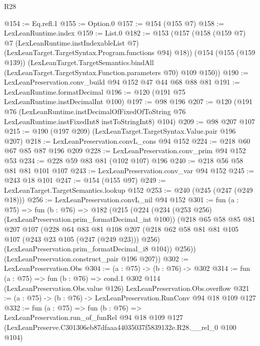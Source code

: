 \begin{lexlean}{R28}
\begin{coremodule}
@154 := Eq.refl.{1}
@155 := Option.{0}
@157 := @154 (@155 @7)
@158 := LexLeanRuntime.index
@159 := List.{0}
@182 := @153
    (@157
      (@158
        (@159 @7)
        @7
        (LexLeanRuntime.instIndexableList @7)
        (LexLeanTarget.TargetSyntax.Program.functions @94)
        @18))
    (@154
      (@155 (@159 @139))
      (LexLeanTarget.TargetSemantics.bindAll
        (LexLeanTarget.TargetSyntax.Function.parameters @70)
        @109
        @150))
@190 := LexLeanPreservation.conv_build @94 @152 @47 @44 @68 @88 @81
@191 := LexLeanRuntime.formatDecimal
@196 := @120 (@191 @75 LexLeanRuntime.instDecimalInt @100)
@197 := @98 @196
@207 := @120
    (@191
      @76
      (LexLeanRuntime.instDecimalOfFixedOfToString
        @76
        LexLeanRuntime.instFixedInt8
        instToStringInt8)
      @104)
@209 := @98 @207 @107
@215 := @190 (@197 @209) (LexLeanTarget.TargetSyntax.Value.pair @196 @207)
@218 := LexLeanPreservation.convL_cons @94 @152
@224 := @218 @60 @67 @85 @87 @196 @209
@228 := LexLeanPreservation.conv_prim @94 @152 @53
@234 := @228 @59 @83 @81 (@102 @107) @196
@240 := @218 @56 @58 @81 @81 @101 @107
@243 := LexLeanPreservation.conv_var @94 @152
@245 := @243 @18 @101
@247 := @154 (@155 @97)
@249 := LexLeanTarget.TargetSemantics.lookup @152
@253 := @240 (@245 (@247 (@249 @18)))
@256 := LexLeanPreservation.convL_nil @94 @152
@301 := fun (a : @75) =>
  fun (b : @76) =>
  @182
    (@215
      (@224
        (@234 (@253 @256) (LexLeanPreservation.prim_formatDecimal_int @100))
        (@218
          @65
          @58
          @85
          @81
          @207
          @107
          (@228
            @64
            @83
            @81
            @108
            @207
            (@218 @62 @58 @81 @81 @105 @107 (@243 @23 @105 (@247 (@249 @23))) @256)
            (LexLeanPreservation.prim_formatDecimal_i8 @104))
          @256))
      (LexLeanPreservation.construct_pair @196 @207))
@302 := LexLeanPreservation.Obs
@304 := (a : @75) -> (b : @76) -> @302
@314 := fun (a : @75) =>
  fun (b : @76) =>
  cond.{1} @302 @114 (LexLeanPreservation.Obs.value @126) LexLeanPreservation.Obs.overflow
@321 := (a : @75) -> (b : @76) -> LexLeanPreservation.RunConv @94 @18 @109 @127
@332 := fun (a : @75) =>
  fun (b : @76) =>
  LexLeanPreservation.run_of_funRel
    @94
    @18
    @109
    @127
    (LexLeanPreserve.C301306eb87dfaaa44035037f5839132e.R28.__rel_0 @100 @104)
\end{coremodule}
\end{lexlean}
